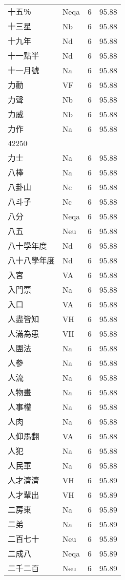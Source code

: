 \documentclass[twocolumn]{book}
\begin{document}
\begin{supertabular}{llrr}
十五％ & Neqa & 6 &  95.88\\
十三星 & Nb & 6 &  95.88\\
十九年 & Nd & 6 &  95.88\\
十一點半 & Nd & 6 &  95.88\\
十一月號 & Na & 6 &  95.88\\
力勸 & VF & 6 &  95.88\\
力聲 & Nb & 6 &  95.88\\
力威 & Nb & 6 &  95.88\\
力作 & Na & 6 &  95.88\\
42250\\
力士 & Na & 6 &  95.88\\
八棒 & Na & 6 &  95.88\\
八卦山 & Nc & 6 &  95.88\\
八斗子 & Nc & 6 &  95.88\\
八分 & Neqa & 6 &  95.88\\
八五 & Neu & 6 &  95.88\\
八十學年度 & Nd & 6 &  95.88\\
八十八學年度 & Nd & 6 &  95.88\\
入宮 & VA & 6 &  95.88\\
入門票 & Na & 6 &  95.88\\
入口 & VA & 6 &  95.88\\
人盡皆知 & VH & 6 &  95.88\\
人滿為患 & VH & 6 &  95.88\\
人團法 & Na & 6 &  95.88\\
人參 & Na & 6 &  95.88\\
人流 & Na & 6 &  95.88\\
人物畫 & Na & 6 &  95.88\\
人事權 & Na & 6 &  95.88\\
人肉 & Na & 6 &  95.88\\
人仰馬翻 & VA & 6 &  95.88\\
人犯 & Na & 6 &  95.88\\
人民軍 & Na & 6 &  95.88\\
人才濟濟 & VH & 6 &  95.89\\
人才輩出 & VH & 6 &  95.89\\
二房東 & Na & 6 &  95.89\\
二弟 & Na & 6 &  95.89\\
二百七十 & Neu & 6 &  95.89\\
二成八 & Neqa & 6 &  95.89\\
二千二百 & Neu & 6 &  95.89\\

\end{supertabular}
\end{document}
